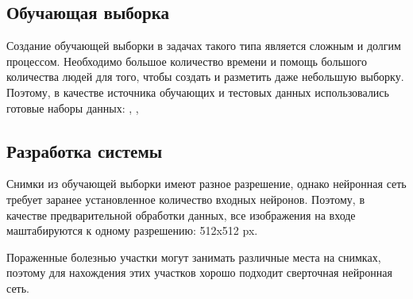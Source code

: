 
\subsection{Обучающая выборка}
Создание обучающей выборки в задачах такого типа является сложным
и долгим процессом. Необходимо большое количество времени и помощь
большого количества людей для того, чтобы создать и разметить
даже небольшую выборку.
Поэтому, в качестве источника обучающих и тестовых данных использовались готовые наборы данных: \cite{tawsifurrahman}, \cite{cohen2020covid}, \cite{wang2020covidnet}


\subsection{Разработка системы}
Снимки из обучающей выборки имеют разное разрешение, однако нейронная сеть требует заранее установленное количество входных нейронов. Поэтому, в качестве предварительной обработки данных, все изображения на входе маштабируются к одному разрешению: 512x512 px.

Пораженные болезнью участки могут занимать различные места на снимках, поэтому для нахождения этих участков хорошо подходит сверточная нейронная сеть.


\clearpage
